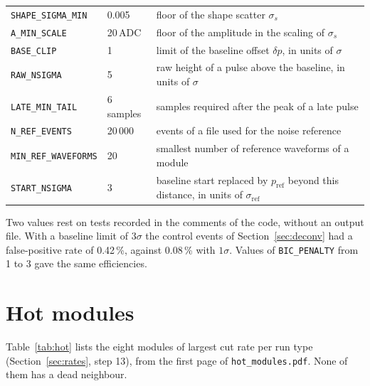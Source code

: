 \documentclass[11pt]{article}
\newcommand{\code}[1]{\texttt{#1}}
\begin{document}
\begin{table}[htbp]
\begin{tabular}{lll}
\code{SHAPE\_SIGMA\_MIN} & 0.005 & floor of the shape scatter $\sigma_s$ \\
\code{A\_MIN\_SCALE} & 20\,ADC & floor of the amplitude in the scaling of $\sigma_s$ \\
\code{BASE\_CLIP} & 1 & limit of the baseline offset $\delta p$, in units of $\sigma$ \\
\code{RAW\_NSIGMA} & 5 & raw height of a pulse above the baseline, in units of $\sigma$ \\
\code{LATE\_MIN\_TAIL} & 6 samples & samples required after the peak of a late pulse \\
\midrule
\code{N\_REF\_EVENTS} & 20\,000 & events of a file used for the noise reference \\
\code{MIN\_REF\_WAVEFORMS} & 20 & smallest number of reference waveforms of a module \\
\code{START\_NSIGMA} & 3 & baseline start replaced by $p_{\mathrm{ref}}$ beyond this distance, in units of $\sigma_{\mathrm{ref}}$ \\
\bottomrule
\end{tabular}
\end{table}

Two values rest on tests recorded in the comments of the code, without an output file. With a baseline limit of $3\sigma$ the control events of Section~\ref{sec:deconv} had a false-positive rate of 0.42\,\%, against 0.08\,\% with $1\sigma$. Values of \code{BIC\_PENALTY} from 1 to 3 gave the same efficiencies.

\section{Hot modules}
\label{app:hot}

Table~\ref{tab:hot} lists the eight modules of largest cut rate per run type (Section~\ref{sec:rates}, step 13), from the first page of \code{hot\_modules.pdf}. None of them has a dead neighbour.
\end{document}
